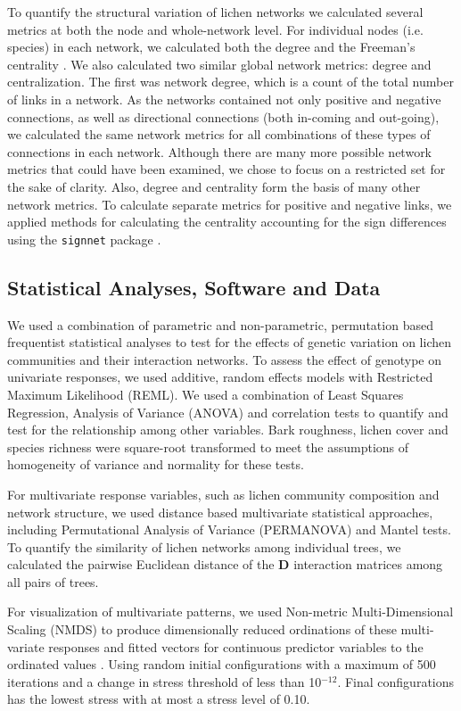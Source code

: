 \documentclass[11pt,twocolumn,twoside,lineno]{pnas-new}
\begin{document}
{To quantify the structural variation of lichen networks we calculated
several metrics at both the node and whole-network level. For
individual nodes (i.e. species) in each network, we calculated both
the degree and the Freeman's centrality \cite{sna}. We also calculated
two similar global network metrics: degree and centralization. The
first was network degree, which is a count of the total number of
links in a network. As the networks contained not only positive and
negative connections, as well as directional connections (both
in-coming and out-going), we calculated the same network metrics for
all combinations of these types of connections in each
network. Although there are many more possible network metrics that
could have been examined, we chose to focus on a restricted set for
the sake of clarity. Also, degree and centrality form the basis of
many other network metrics. To calculate separate metrics for positive
and negative links, we applied methods for calculating the centrality
accounting for the sign differences \cite{Everett2014NetworksTies}
using the \texttt{signnet} package \cite{siggnet}.


\subsection*{Statistical Analyses, Software and Data}

We used a combination of parametric and non-parametric, permutation
based frequentist statistical analyses to test for the effects of
genetic variation on lichen communities and their interaction
networks. To assess the effect of genotype on univariate responses, we
used additive, random effects models with Restricted Maximum
Likelihood (REML). We used a combination of Least Squares Regression,
Analysis of Variance (ANOVA) and correlation tests to quantify and
test for the relationship among other variables. Bark roughness,
lichen cover and species richness were square-root transformed to meet
the assumptions of homogeneity of variance and normality for these
tests.

For multivariate response variables, such as lichen community
composition and network structure, we used distance based multivariate
statistical approaches, including Permutational Analysis of Variance
(PERMANOVA) and Mantel tests. To quantify the similarity of lichen
networks among individual trees, we calculated the pairwise Euclidean
distance of the $\mathbf{D}$ interaction matrices among all pairs of
trees.

For visualization of multivariate patterns, we used Non-metric
Multi-Dimensional Scaling (NMDS) \cite{ecodist} to produce
dimensionally reduced ordinations of these multi-variate responses and
fitted vectors for continuous predictor variables to the ordinated
values \cite{vegan}. Using random initial configurations with a
maximum of 500 iterations and a change in stress threshold of less
than 10$^{-12}$. Final configurations has the lowest stress with at
most a stress level of 0.10.

}
\end{document}
